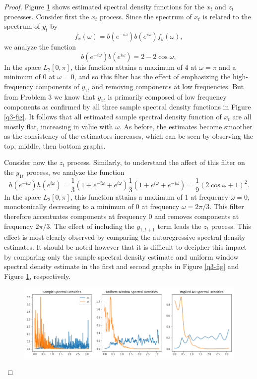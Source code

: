 \documentclass[oneside,reqno]{amsart}
\theoremstyle{definition}
\begin{document}
\begin{proof}
Figure \ref{q4-fig} shows estimated spectral density functions for the $x_t$ and $z_t$ processes. Consider first the $x_t$ process. Since the spectrum of $x_t$ is related to the spectrum of $y_t$ by 
\[
	f_x(\omega) = b(e^{-i\omega})b(e^{i\omega}) f_y(\omega), 
\]
we analyze the function
\[
	b(e^{-i\omega})b(e^{i\omega}) = 2 - 2 \cos \omega,
\]
In the space $L_2[0,\pi]$, this function attains a maximum of 4 at $\omega=\pi$ and a minimum of 0 at $\omega=0$, and so this filter has the effect of emphasizing the high-frequency components of $y_{1t}$ and removing components at low frequencies. But from Problem 3 we know that $y_{1t}$ is primarily composed of low frequency components as confirmed by all three sample spectral density functions in Figure \ref{q3-fig}. It follows that all estimated sample spectral density function of $x_t$ are all mostly flat, increasing in value with $\omega$. As before, the estimates become smoother as the consistency of the estimators increases, which can be seen by observing the top, middle, then bottom graphs. 
\par
Consider now the $z_t$ process. Similarly, to understand the affect of this filter on the $y_{1t}$ process, we analyze the function
\[
	h(e^{-i\omega}) h(e^{i\omega}) = \frac{1}{3} (1+ e^{-i\omega} + e^{i\omega})\frac{1}{3} (1+ e^{i\omega} + e^{-i\omega}) = \frac{1}{9} (2 \cos \omega + 1)^2.
\]
In the space $L_2[0,\pi]$, this function attains a maximum of 1 at frequency $\omega=0$, monotonically decreasing to a minimum of 0 at frequency $\omega = 2 \pi/3$. This filter therefore accentuates components at frequency 0 and removes components at frequency $2 \pi/3$. The effect of including the $y_{1,t+1}$ term leads the $z_t$ process. This effect is most clearly observed by comparing the autoregressive spectral density estimates. It should be noted however that it is difficult to decipher this impact by comparing only the sample spectral density estimate and uniform window spectral density estimate in the first and second graphs in Figure \ref{q3-fig} and Figure \ref{q4-fig}, respectively. 

\begin{figure}
\includegraphics[width=\textwidth]{q4-fig}
\caption{}
\label{q4-fig}
\end{figure}
\end{proof}
\end{document}
